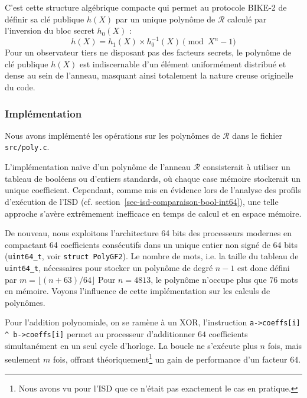 \documentclass[11pt,a4paper]{article}
\begin{document}
C'est cette structure algébrique compacte qui permet au protocole BIKE-2 de définir sa clé publique $h(X)$ par un unique polynôme de $\mathcal{R}$ calculé par l'inversion du bloc secret $h_0(X)$ :
\begin{equation}
h(X) = h_1(X) \times h_0^{-1}(X) \pmod{X^n - 1}
\end{equation}
Pour un observateur tiers ne disposant pas des facteurs secrets, le polynôme de
clé publique $h(X)$ est indiscernable d'un élément uniformément distribué et
dense au sein de l'anneau, masquant ainsi totalement la nature creuse originelle
du code.

\subsubsection{Implémentation}

Nous avons implémenté les opérations sur les polynômes de $\mathcal{R}$ dans le
fichier \texttt{src/poly.c}.

L'implémentation naïve d'un polynôme de l'anneau $\mathcal{R}$ consisterait à
utiliser un tableau de booléens ou d'entiers standards, où chaque case mémoire
stockerait un unique coefficient.
Cependant, comme mis en évidence lors de l'analyse des profils d'exécution de
l'ISD (cf. section~\ref{sec-isd-comparaison-bool-int64}), une telle approche
s'avère extrêmement inefficace en temps de calcul et en espace mémoire.

De nouveau, nous exploitons l'architecture 64 bits des processeurs modernes en
compactant 64 coefficients consécutifs dans un unique entier non signé
de 64 bits (\texttt{uint64\_t}, voir \texttt{struct PolyGF2}).
Le nombre de mots, i.e. la taille du tableau de \texttt{uint64\_t}, nécessaires
pour stocker un polynôme de degré $n-1$ est donc défini par $m = \lfloor (n + 63)/64 \rfloor$
Pour $n = 4813$, le polynôme n'occupe plus que $76$ mots en mémoire.
Voyons l'influence de cette implémentation sur les calculs de polynômes.

Pour l'addition polynomiale, on se ramène à un XOR, l'instruction
\texttt{a->coeffs[i] \^{} b->coeffs[i]} permet au processeur d'additionner
$64$ coefficients simultanément en un seul cycle d'horloge. La boucle ne
s'exécute plus $n$ fois, mais seulement $m$ fois, offrant
théoriquement\footnote{Nous avons vu pour l'ISD que ce n'était pas exactement le
cas en pratique.} un gain de performance d'un facteur $64$.
\end{document}
